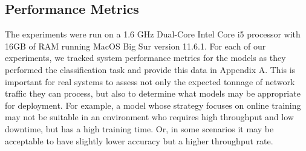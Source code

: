 \subsection{Performance Metrics}

The experiments were run on a 1.6 GHz Dual-Core Intel Core i5 processor with 16GB of RAM running MacOS Big Sur version 11.6.1. For each of our experiments, we tracked system performance metrics for the models as they performed the classification task and provide this data in Appendix A. This is important for real systems to assess not only the expected tonnage of network traffic they can process, but also to determine what models may be appropriate for deployment. For example, a model whose strategy focuses on online training may not be suitable in an environment who requires high throughput and low downtime, but has a high training time. Or, in some scenarios it may be acceptable to have slightly lower accuracy but a higher throughput rate.
